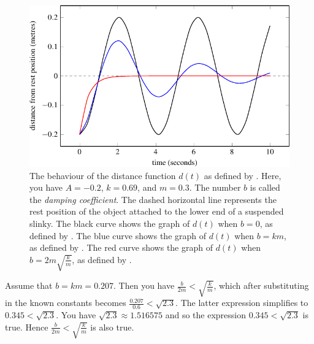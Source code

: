\documentclass[a4paper,oneside,12pt]{article}
\begin{document}
\begin{problem}
{\begin{solution}
\begin{figure}[!htbp]
\centering
\includegraphics[scale=1.1]{image/13/damped.pdf}
\caption{%
  The behaviour of the distance function $d(t)$ as defined by
  .  Here, you have
  $A = -0.2$, $k = 0.69$, and $m = 0.3$.  The number $b$ is called the
  \emph{damping coefficient}.  The dashed horizontal line represents
  the rest position of the object attached to the lower end of a
  suspended slinky.  The black curve shows the graph of $d(t)$ when
  $b = 0$, as defined by .
  The blue curve shows the graph of $d(t)$ when $b = km$, as defined
  by .  The red
  curve shows the graph of $d(t)$ when $b = 2m \sqrt{\frac{k}{m}}$, as
  defined by .
}
\label{fig:trigonometric:damped_no_friction}
\end{figure}

Assume that $b = km = 0.207$.  Then you have
$\frac{b}{2m} < \sqrt{\frac{k}{m}}$, which after substituting in the
known constants becomes $\frac{0.207}{0.6} < \sqrt{2.3}$.  The latter
expression simplifies to $0.345 < \sqrt{2.3}$.  You have
$\sqrt{2.3} \approx 1.516575$ and so the expression
$0.345 < \sqrt{2.3}$ is true.  Hence
$\frac{b}{2m} < \sqrt{\frac{k}{m}}$ is also true.


\end{solution}}
\end{problem}
\end{document}
